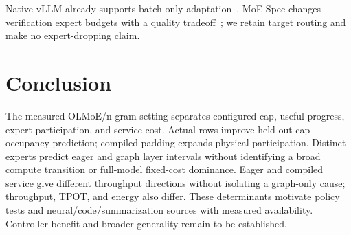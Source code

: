 \documentclass[conference,letterpaper]{IEEEtran}
\begin{document}
Native vLLM already supports batch-only adaptation~\cite{vllmdynamic,vllmconfig}. MoE-Spec changes verification expert budgets with a quality tradeoff~\cite{moespec}; we retain target routing and make no expert-dropping claim.

\section{Conclusion}
The measured OLMoE/n-gram setting separates configured cap, useful progress, expert participation, and service cost. Actual rows improve held-out-cap occupancy prediction; compiled padding expands physical participation. Distinct experts predict eager and graph layer intervals without identifying a broad compute transition or full-model fixed-cost dominance. Eager and compiled service give different throughput directions without isolating a graph-only cause; throughput, TPOT, and energy also differ. These determinants motivate policy tests and neural/code/summarization sources with measured availability. Controller benefit and broader generality remain to be established.



\end{document}
